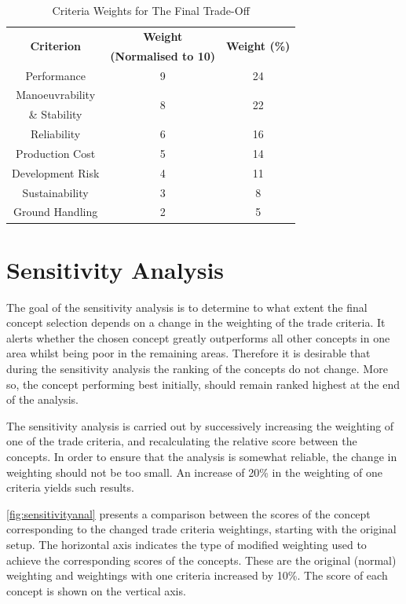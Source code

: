 \begin{table}[H]
    \centering
    \caption{Criteria Weights for The Final Trade-Off}
    \begin{tabular}{ccc}
    \toprule
    \multirow{2}{*}{\textbf{Criterion}}    &  \textbf{Weight} & \multirow{2}{*}{\textbf{Weight (\%)}}\\
         & \textbf{(Normalised to 10)} & \\ \midrule
    Performance & 9 & 24 \\ \hdashline
    Manoeuvrability & \multirow{2}{*}{8} & \multirow{2}{*}{22} \\
    \& Stability & & \\ \hdashline
    Reliability & 6 & 16 \\ \hdashline
    Production Cost & 5 & 14 \\ \hdashline
    Development Risk & 4 & 11 \\ \hdashline
    Sustainability & 3 & 8 \\ \hdashline
    Ground Handling & 2 & 5 \\ \bottomrule
    \end{tabular}
    \label{tab:weightoffinaltradeoff}
\end{table}

\section{Sensitivity Analysis}
\label{sec:sens_anal}

The goal of the sensitivity analysis is to determine to what extent the final concept selection depends on a change in the weighting of the trade criteria. It alerts whether the chosen concept greatly outperforms all other concepts in one area whilst being poor in the remaining areas. Therefore it is desirable that during the sensitivity analysis the ranking of the concepts do not change. More so, the concept performing best initially, should remain ranked highest at the end of the analysis.

The sensitivity analysis is carried out by successively increasing the weighting of one of the trade criteria, and recalculating the relative score between the concepts. In order to ensure that the analysis is somewhat reliable, the change in weighting should not be too small. An increase of 20\% in the weighting of one criteria yields such results.

\autoref{fig:sensitivityanal} presents a comparison between the scores of the concept corresponding to the changed trade criteria weightings, starting with the original setup. The horizontal axis indicates the type of modified weighting used to achieve the corresponding scores of the concepts. These are the original (normal) weighting and weightings with one criteria increased by 10\%. The score of each concept is shown on the vertical axis.

